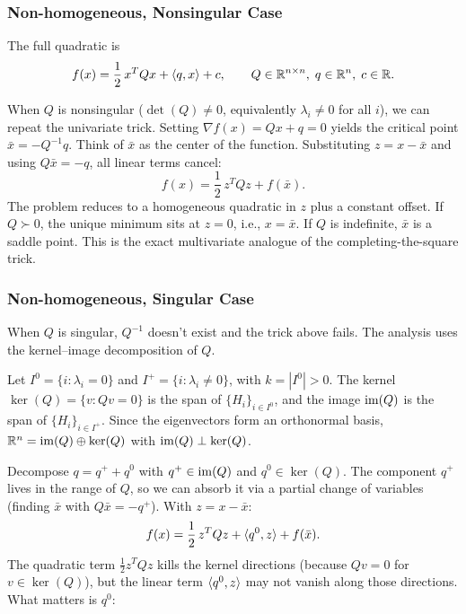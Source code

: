 \subsubsection{Non-homogeneous, Nonsingular Case}\label{sec:quad-nonhom}

The full quadratic is
\begin{equation}\label{eq:full-quad}
	f(x) = \frac{1}{2}\, x^T Q x + \langle q, x\rangle + c,
	\qquad Q \in \mathbb{R}^{n \times n},\; q \in \mathbb{R}^n,\; c \in \mathbb{R}.
\end{equation}

When $Q$ is nonsingular ($\det(Q) \neq 0$, equivalently $\lambda_i \neq 0$ for all $i$), we can repeat the univariate trick.
Setting $\nabla f(x) = Qx + q = 0$ yields the critical point $\bar{x} = -Q^{-1} q$.
Think of $\bar{x}$ as the center of the function.
Substituting $z = x - \bar{x}$ and using $Q\bar{x} = -q$, all linear terms cancel:
\begin{equation}\label{eq:completing-square-multivariate}
	f(x) = \frac{1}{2}\, z^T Q z + f(\bar{x}).
\end{equation}
The problem reduces to a homogeneous quadratic in $z$ plus a constant offset.
If $Q \succ 0$, the unique minimum sits at $z = 0$, i.e., $x = \bar{x}$.
If $Q$ is indefinite, $\bar{x}$ is a saddle point.
This is the exact multivariate analogue of the completing-the-square trick.

\subsubsection{Non-homogeneous, Singular Case}\label{sec:opt-quad-singular}

When $Q$ is singular, $Q^{-1}$ doesn't exist and the trick above fails.
The analysis uses the kernel--image decomposition of $Q$.

Let $I^0 = \{i : \lambda_i = 0\}$ and $I^+ = \{i : \lambda_i \neq 0\}$, with $k = |I^0| > 0$.
The kernel $\ker(Q) = \{v : Qv = 0\}$ is the span of $\{H_i\}_{i \in I^0}$, and the image $\operatorname{im}(Q)$ is the span of $\{H_i\}_{i \in I^+}$.
Since the eigenvectors form an orthonormal basis, $\mathbb{R}^n = \operatorname{im}(Q) \oplus \ker(Q)$ with $\operatorname{im}(Q) \perp \ker(Q)$.

Decompose $q = q^+ + q^0$ with $q^+ \in \operatorname{im}(Q)$ and $q^0 \in \ker(Q)$.
The component $q^+$ lives in the range of $Q$, so we can absorb it via a partial change of variables (finding $\bar{x}$ with $Q\bar{x} = -q^+$).
With $z = x - \bar{x}$:
\begin{equation}\label{eq:singular-quad-reduced}
	f(x) = \frac{1}{2}\, z^T Q z + \langle q^0, z\rangle + f(\bar{x}).
\end{equation}
The quadratic term $\frac{1}{2} z^T Q z$ kills the kernel directions (because $Qv = 0$ for $v \in \ker(Q)$), but the linear term $\langle q^0, z\rangle$ may not vanish along those directions.
What matters is $q^0$:

